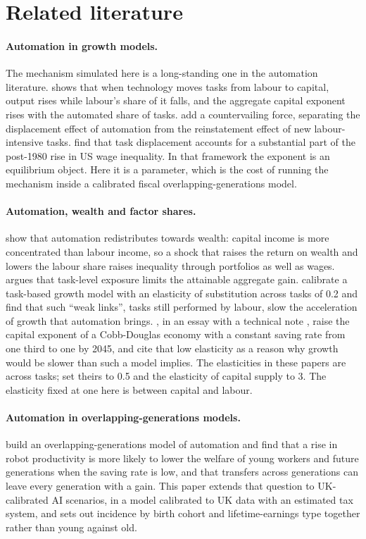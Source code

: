 \section{Related literature}
\label{sec:literature}

\paragraph{Automation in growth models.} The mechanism simulated here is a long-standing one in the automation literature. \citet{zeira1998} shows that when technology moves tasks from labour to capital, output rises while labour's share of it falls, and the aggregate capital exponent rises with the automated share of tasks. \citet{acemoglu2018} add a countervailing force, separating the displacement effect of automation from the reinstatement effect of new labour-intensive tasks. \citet{acemoglu2022tasks} find that task displacement accounts for a substantial part of the post-1980 rise in US wage inequality. In that framework the exponent is an equilibrium object. Here it is a parameter, which is the cost of running the mechanism inside a calibrated fiscal overlapping-generations model.

\paragraph{Automation, wealth and factor shares.} \citet{moll2022} show that automation redistributes towards wealth: capital income is more concentrated than labour income, so a shock that raises the return on wealth and lowers the labour share raises inequality through portfolios as well as wages. \citet{acemoglu2025} argues that task-level exposure limits the attainable aggregate gain. \citet{jonestonetti2026} calibrate a task-based growth model with an elasticity of substitution across tasks of 0.2 and find that such ``weak links'', tasks still performed by labour, slow the acceleration of growth that automation brings. \citet{mollimas2026}, in an essay with a technical note \citep{imasmoll2026}, raise the capital exponent of a Cobb-Douglas economy with a constant saving rate from one third to one by 2045, and cite that low elasticity as a reason why growth would be slower than such a model implies. The elasticities in these papers are across tasks; \citet{korinek2026} set theirs to 0.5 and the elasticity of capital supply to 3. The elasticity fixed at one here is between capital and labour.

\paragraph{Automation in overlapping-generations models.} \citet{sachs2015robots} build an overlapping-generations model of automation and find that a rise in robot productivity is more likely to lower the welfare of young workers and future generations when the saving rate is low, and that transfers across generations can leave every generation with a gain. This paper extends that question to UK-calibrated AI scenarios, in a model calibrated to UK data with an estimated tax system, and sets out incidence by birth cohort and lifetime-earnings type together rather than young against old.

